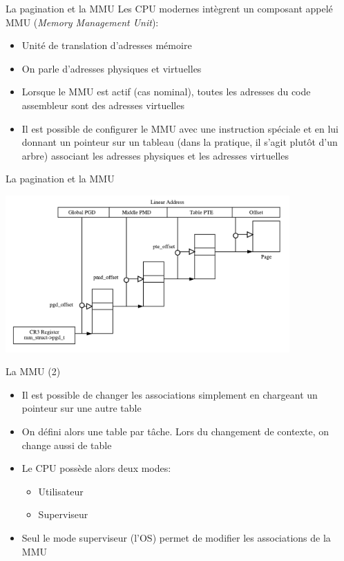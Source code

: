\begin{frame}{La pagination et la MMU}
  Les CPU  modernes intègrent  un composant appelé  MMU (\emph{Memory
    Management Unit}):
  \begin{itemize}
  \item  Unité de translation d'adresses mémoire
  \item  On parle d'adresses physiques et virtuelles
  \item Lorsque le  MMU est actif (cas nominal),  toutes les adresses
    du code assembleur sont des adresses virtuelles
  \item  Il est  possible de  configurer le  MMU avec  une instruction
    spéciale et  en lui  donnant un pointeur  sur un tableau  (dans la
    pratique,  il s'agit  plutôt d'un  arbre) associant  les adresses
    physiques et les adresses virtuelles
  \end{itemize}
\end{frame}

\begin{frame}{La pagination et la MMU}
  \begin{center}
    \includegraphics[height=6cm]{pics/linearaddress}
  \end{center}
\end{frame}

\begin{frame}{La MMU (2)}
  \begin{itemize}
  \item  Il est  possible de  changer les  associations  simplement en
    chargeant un pointeur sur une autre table
  \item On  défini alors une table  par tâche.  Lors  du changement de
    contexte, on change aussi de table
  \item Le CPU possède alors deux modes:
    \begin{itemize}
    \item  Utilisateur
    \item  Superviseur
    \end{itemize}
  \item  Seul  le  mode  superviseur  (l'OS) permet  de  modifier  les
    associations de la MMU
  \end{itemize}
\end{frame}

